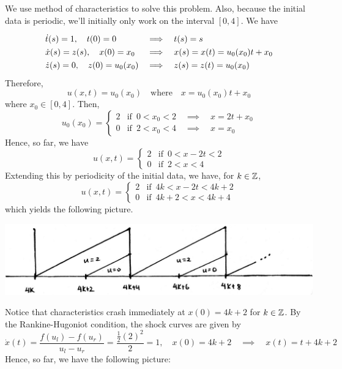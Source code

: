We use method of characteristics to solve this problem. Also, because the initial data is periodic, we'll initially only work on the interval $[0,4]$. We have
$$
\begin{array}{lll}
\asep
\dot{t}(s) = 1, \quad t(0) = 0 & \implies & t(s) = s \\ \asep
\dot{x}(s) = z(s), \quad x(0) = x_0 & \implies & x(s) = x(t) = u_0(x_0)t + x_0 \\ \asep
\dot{z}(s) = 0, \quad z(0) = u_0(x_0) & \implies & z(s) = z(t) = u_0(x_0)
\end{array}
$$
Therefore,
$$ u(x,t) = u_0 (x_0) \quad \text{where} \quad x = u_0(x_0) t + x_0 $$
where $x_0 \in [0,4]$. Then,
\[
u_0(x_0) = \left\{
\begin{array}{ll}
 2 & \text{if} \,\,\, 0 < x_0 < 2 \quad \implies \quad x = 2t+x_0 \\
 0 & \text{if} \,\,\, 2 < x_0 < 4 \quad \implies \quad x = x_0
\end{array}
\right.
\]
Hence, so far, we have
\[
u(x,t) = \left\{
\begin{array}{ll}
 2 & \text{if} \,\,\, 0 < x-2t < 2 \\
 0 & \text{if} \,\,\, 2 < x < 4
\end{array}
\right.
\]
Extending this by periodicity of the initial data, we have, for $k \in \mathbb{Z}$,
\[
u(x,t) = \left\{
\begin{array}{ll}
 2 & \text{if} \,\,\, 4k < x-2t < 4k+2 \\
 0 & \text{if} \,\,\, 4k+2 < x < 4k+4
\end{array}
\right.
\]
which yields the following picture.

\begin{center}
\includegraphics[scale=0.4]{./_Figures/f128img1.png}
\end{center}

Notice that characteristics crash immediately at $x(0) = 4k+2$ for $k \in \mathbb{Z}$. By the Rankine-Hugoniot condition, the shock curves are given by
$$ \dot{x}(t) = \frac{f(u_l) - f(u_r)}{u_l-u_r} = \frac{\frac{1}{2}(2)^2}{2} = 1, \quad x(0) = 4k+2 \quad \implies \quad x(t) = t+4k+2$$
\newpage
Hence, so far, we have the following picture:

